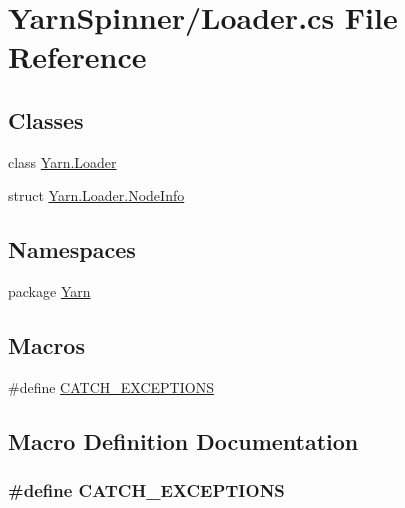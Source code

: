 \hypertarget{a00142}{\section{Yarn\-Spinner/\-Loader.cs File Reference}
\label{a00142}
}
\subsection*{Classes}
\begin{DoxyCompactItemize}
\item 
class \hyperlink{a00065}{Yarn.\-Loader}
\item 
struct \hyperlink{a00070}{Yarn.\-Loader.\-Node\-Info}
\end{DoxyCompactItemize}
\subsection*{Namespaces}
\begin{DoxyCompactItemize}
\item 
package \hyperlink{a00040}{Yarn}
\end{DoxyCompactItemize}
\subsection*{Macros}
\begin{DoxyCompactItemize}
\item 
\#define \hyperlink{a00142_a77a5bfa27437777ac8554e94e76e4e43}{C\-A\-T\-C\-H\-\_\-\-E\-X\-C\-E\-P\-T\-I\-O\-N\-S}
\end{DoxyCompactItemize}


\subsection{Macro Definition Documentation}
\hypertarget{a00142_a77a5bfa27437777ac8554e94e76e4e43}{
\subsubsection[{C\-A\-T\-C\-H\-\_\-\-E\-X\-C\-E\-P\-T\-I\-O\-N\-S}]{\setlength{\rightskip}{0pt plus 5cm}\#define C\-A\-T\-C\-H\-\_\-\-E\-X\-C\-E\-P\-T\-I\-O\-N\-S}}\label{a00142_a77a5bfa27437777ac8554e94e76e4e43}

